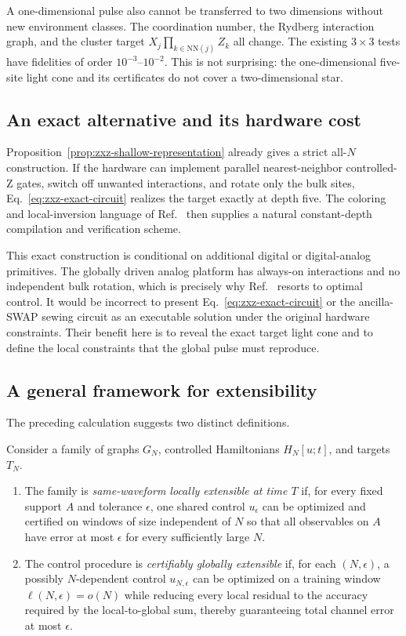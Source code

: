 A one-dimensional pulse also cannot be transferred to two dimensions without
new environment classes.  The coordination number, the Rydberg interaction
graph, and the cluster target $X_j\prod_{k\in\mathrm{NN}(j)}Z_k$ all change.
The existing $3\times3$ tests have fidelities of order $10^{-3}$--$10^{-2}$.
This is not surprising: the one-dimensional five-site light cone and its
certificates do not cover a two-dimensional star.

\subsection{An exact alternative and its hardware cost}

Proposition~\ref{prop:zxz-shallow-representation} already gives a strict
all-$N$ construction.  If the hardware can implement parallel
nearest-neighbor controlled-Z gates, switch off unwanted interactions, and
rotate only the bulk sites, Eq.~\eqref{eq:zxz-exact-circuit} realizes the
target exactly at depth five.  The coloring and local-inversion language of
Ref.~\cite{huang_2024_learning} then supplies a natural constant-depth
compilation and verification scheme.

This exact construction is conditional on additional digital or
digital-analog primitives.  The globally driven analog platform has always-on
interactions and no independent bulk rotation, which is precisely why
Ref.~\cite{hu2025universal} resorts to optimal control.  It would be incorrect
to present Eq.~\eqref{eq:zxz-exact-circuit} or the ancilla-SWAP sewing circuit
as an executable solution under the original hardware constraints.  Their
benefit here is to reveal the exact target light cone and to define the local
constraints that the global pulse must reproduce.

\subsection{A general framework for extensibility}

The preceding calculation suggests two distinct definitions.

\begin{definition}
Consider a family of graphs $G_N$, controlled Hamiltonians $H_N[u;t]$, and
targets $T_N$.
\begin{enumerate}
\item The family is \emph{same-waveform locally extensible at time $T$} if,
for every fixed support $A$ and tolerance $\epsilon$, one shared control
$u_\epsilon$ can be optimized and certified on windows of size independent
of $N$ so that all observables on $A$ have error at most $\epsilon$ for every
sufficiently large $N$.
\item The control procedure is \emph{certifiably globally extensible} if, for
each $(N,\epsilon)$, a possibly $N$-dependent control $u_{N,\epsilon}$ can be
optimized on a training window $\ell(N,\epsilon)=o(N)$ while reducing every
local residual to the accuracy required by the local-to-global sum, thereby
guaranteeing total channel error at most $\epsilon$.
\end{enumerate}
\end{definition}

